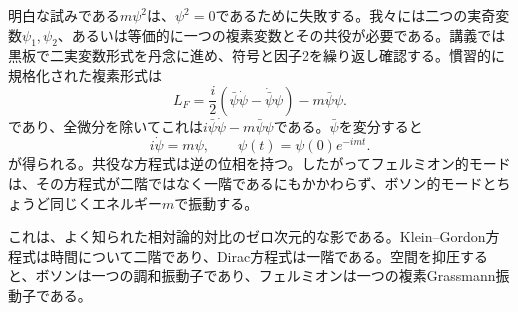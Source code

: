 \begin{classroomqa}
\end{classroomqa}

明白な試みである\(m\psi^2\)は、\(\psi^2=0\)であるために失敗する。我々には二つの実奇変数\(\psi_1,\psi_2\)、あるいは等価的に一つの複素変数とその共役が必要である。講義では黒板で二実変数形式を丹念に進め、符号と因子2を繰り返し確認する。慣習的に規格化された複素形式は
\begin{equation}
L_F=\frac{i}{2}
\left(\bar\psi\dot\psi-\dot{\bar\psi}\psi\right)
-m\bar\psi\psi.
\label{eq:l7-fermion-lagrangian}
\end{equation}
であり、全微分を除いてこれは\(i\bar\psi\dot\psi-m\bar\psi\psi\)である。\(\bar\psi\)を変分すると
\begin{equation}
i\dot\psi=m\psi,
\qquad
\psi(t)=\psi(0)e^{-imt}.
\label{eq:l7-fermion-eom}
\end{equation}
が得られる。共役な方程式は逆の位相を持つ。したがってフェルミオン的モードは、その方程式が二階ではなく一階であるにもかかわらず、ボソン的モードとちょうど同じくエネルギー\(m\)で振動する。


これは、よく知られた相対論的対比のゼロ次元的な影である。Klein--Gordon方程式は時間について二階であり、Dirac方程式は一階である。空間を抑圧すると、ボソンは一つの調和振動子であり、フェルミオンは一つの複素Grassmann振動子である。

\begin{classroomqa}
\end{classroomqa}

